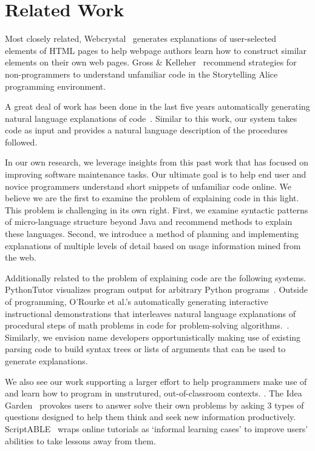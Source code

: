\section{Related Work}

Most closely related, Webcrystal~\cite{chang_webcrystal_2012} generates explanations of user-selected elements of HTML pages to help webpage authors learn how to construct similar elements on their own web pages.
Gross \& Kelleher~\cite{gross_non-programmers_2010} recommend strategies for non-programmers to understand unfamiliar code in the Storytelling Alice programming environment.

A great deal of work has been done in the last five years automatically generating natural language explanations of code~\cite{sridhara_automatically_2011,burden_natural_2011,sridhara_towards_2010,kamimura_towards_2013,mcburney_automatic_2014,sridhara_generating_2011,haiduc_supporting_2010,moreno_automatic_2013}.
Similar to this work, our system takes code as input and provides a natural language description of the procedures followed.

In our own research, we leverage insights from this past work that has focused on improving software maintenance tasks.
Our ultimate goal is to help end user and novice programmers understand short snippets of unfamiliar code online.
We believe we are the first to examine the problem of explaining code in this light.
This problem is challenging in its own right.
First, we examine syntactic patterns of micro-language structure beyond Java and recommend methods to explain these languages.
Second, we introduce a method of planning and implementing explanations of multiple levels of detail based on usage information mined from the web.

Additionally related to the problem of explaining code are the following systems.
PythonTutor visualizes program output for arbitrary Python programs~\cite{guo_online_2013}.
Outside of programming, O'Rourke et al.'s automatically generating interactive instructional demonstrations that interleaves natural language explanations of procedural steps of math problems in code for problem-solving algorithms.~\cite{orourke_framework_2015}.
Similarly, we envision \gls{name} developers opportunistically making use of existing parsing code to build syntax trees or lists of arguments that can be used to generate explanations.

We also see our work supporting a larger effort to help programmers make use of and learn how to program in unstrutured, out-of-classroom contexts.
.
The Idea Garden~\cite{cao_barriers_2012}\cite{cao_end-user_2013} provokes users to answer solve their own problems by asking 3 types of questions designed to help them think and seek new information productively.
ScriptABLE~\cite{dorn_scriptable_2011} wraps online tutorials as `informal learning cases' to improve users' abilities to take lessons away from them. 
